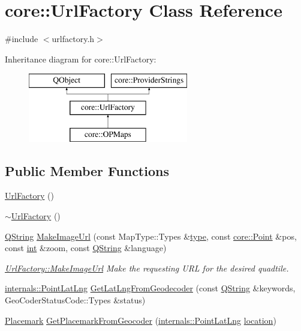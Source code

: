 \hypertarget{classcore_1_1_url_factory}{\section{core\-:\-:Url\-Factory Class Reference}
\label{classcore_1_1_url_factory}
}


{\ttfamily \#include $<$urlfactory.\-h$>$}

Inheritance diagram for core\-:\-:Url\-Factory\-:\begin{figure}[H]
\begin{center}
\leavevmode
\includegraphics[height=3.000000cm]{classcore_1_1_url_factory}
\end{center}
\end{figure}
\subsection*{Public Member Functions}
\begin{DoxyCompactItemize}
\item 
\hyperlink{group___o_p_map_widget_gabc044615454cf1ce949b090b45a3b20d}{Url\-Factory} ()
\item 
\hyperlink{group___o_p_map_widget_ga67b13bc9e7c21c4fcc4471ddce351805}{$\sim$\-Url\-Factory} ()
\item 
\hyperlink{group___u_a_v_objects_plugin_gab9d252f49c333c94a72f97ce3105a32d}{Q\-String} \hyperlink{group___o_p_map_widget_ga7339895a709cbc83dfac87ec5e1a42ff}{Make\-Image\-Url} (const Map\-Type\-::\-Types \&\hyperlink{glext_8h_a7d05960f4f1c1b11f3177dc963a45d86}{type}, const \hyperlink{structcore_1_1_point}{core\-::\-Point} \&pos, const \hyperlink{ioapi_8h_a787fa3cf048117ba7123753c1e74fcd6}{int} \&zoom, const \hyperlink{group___u_a_v_objects_plugin_gab9d252f49c333c94a72f97ce3105a32d}{Q\-String} \&language)
\begin{DoxyCompactList}\small\item\em \hyperlink{group___o_p_map_widget_ga7339895a709cbc83dfac87ec5e1a42ff}{Url\-Factory\-::\-Make\-Image\-Url} Make the requesting U\-R\-L for the desired quadtile. \end{DoxyCompactList}\item 
\hyperlink{structinternals_1_1_point_lat_lng}{internals\-::\-Point\-Lat\-Lng} \hyperlink{group___o_p_map_widget_ga39ab1784711725813c6e90f8be8557b5}{Get\-Lat\-Lng\-From\-Geodecoder} (const \hyperlink{group___u_a_v_objects_plugin_gab9d252f49c333c94a72f97ce3105a32d}{Q\-String} \&keywords, Geo\-Coder\-Status\-Code\-::\-Types \&status)
\item 
\hyperlink{classcore_1_1_placemark}{Placemark} \hyperlink{group___o_p_map_widget_ga3490a9f0d7fad2058ec2e9a04e7c7f4e}{Get\-Placemark\-From\-Geocoder} (\hyperlink{structinternals_1_1_point_lat_lng}{internals\-::\-Point\-Lat\-Lng} \hyperlink{glext_8h_a6f0165ed903f22b8bb600c3e0b628e73}{location})
\end{DoxyCompactItemize}
